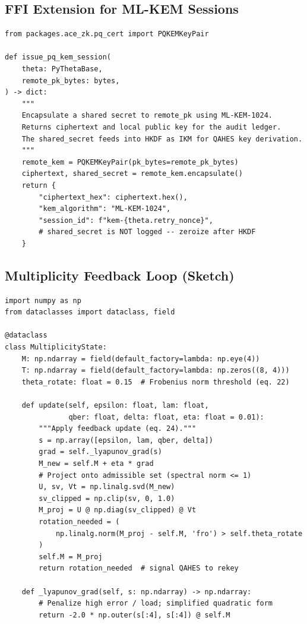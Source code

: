 \documentclass[12pt,letterpaper]{article}
\theoremstyle{plain}
\theoremstyle{definition}
\begin{document}
\subsection{FFI Extension for ML-KEM Sessions}

\begin{lstlisting}[caption={Extended ffi.py: issue\_pq\_kem\_session}]
from packages.ace_zk.pq_cert import PQKEMKeyPair

def issue_pq_kem_session(
    theta: PyThetaBase,
    remote_pk_bytes: bytes,
) -> dict:
    """
    Encapsulate a shared secret to remote_pk using ML-KEM-1024.
    Returns ciphertext and local public key for the audit ledger.
    The shared_secret feeds into HKDF as IKM for QAHES key derivation.
    """
    remote_kem = PQKEMKeyPair(pk_bytes=remote_pk_bytes)
    ciphertext, shared_secret = remote_kem.encapsulate()
    return {
        "ciphertext_hex": ciphertext.hex(),
        "kem_algorithm": "ML-KEM-1024",
        "session_id": f"kem-{theta.retry_nonce}",
        # shared_secret is NOT logged -- zeroize after HKDF
    }
\end{lstlisting}

\subsection{Multiplicity Feedback Loop (Sketch)}

\begin{lstlisting}[caption={Adaptive multiplicity feedback -- key rotation trigger}]
import numpy as np
from dataclasses import dataclass, field

@dataclass
class MultiplicityState:
    M: np.ndarray = field(default_factory=lambda: np.eye(4))
    T: np.ndarray = field(default_factory=lambda: np.zeros((8, 4)))
    theta_rotate: float = 0.15  # Frobenius norm threshold (eq. 22)

    def update(self, epsilon: float, lam: float,
               qber: float, delta: float, eta: float = 0.01):
        """Apply feedback update (eq. 24)."""
        s = np.array([epsilon, lam, qber, delta])
        grad = self._lyapunov_grad(s)
        M_new = self.M + eta * grad
        # Project onto admissible set (spectral norm <= 1)
        U, sv, Vt = np.linalg.svd(M_new)
        sv_clipped = np.clip(sv, 0, 1.0)
        M_proj = U @ np.diag(sv_clipped) @ Vt
        rotation_needed = (
            np.linalg.norm(M_proj - self.M, 'fro') > self.theta_rotate
        )
        self.M = M_proj
        return rotation_needed  # signal QAHES to rekey

    def _lyapunov_grad(self, s: np.ndarray) -> np.ndarray:
        # Penalize high error / load; simplified quadratic form
        return -2.0 * np.outer(s[:4], s[:4]) @ self.M
\end{lstlisting}
\end{document}
